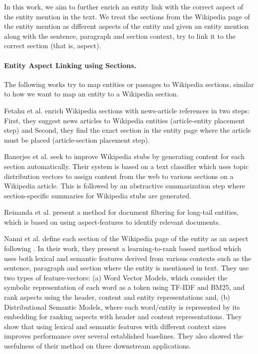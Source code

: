 \documentclass[sigconf,authordraft]{acmart}
\begin{document}
In this work, we aim to further enrich an entity link with the correct aspect of the entity mention in the text. We treat the sections from the Wikipedia page of the entity mention as different aspects of the entity and given an entity mention along with the sentence, paragraph and section context, try to link it to the correct section (that is, aspect).

\paragraph{\textbf{Entity Aspect Linking using Sections.}} 
The following works try to map entities or passages to Wikipedia sections, similar to how we want to map an entity to a Wikipedia section.

Fetahu et al. \cite{fetahu2015automated} enrich Wikipedia sections with news-article references in two steps: First, they suggest news articles to Wikipedia entities (article-entity placement step) and Second, they find the exact section in the entity page where the article must be placed (article-section placement step).

Banerjee et al. \cite{banerjee2015wikikreator} seek to improve Wikipedia stubs by generating content for each section automatically. Their system is based on a text classifier which uses topic distribution vectors to assign content from the web to various sections on a Wikipedia article. This is followed by an abstractive summarization step where section-specific summaries for Wikipedia stubs are generated.

Reinanda et al. \cite{reinanda2016document} present a method for document filtering for long-tail entities, which is based on using aspect-features to identify relevant documents. 

Nanni et al. \cite{nanni2018entity} define each section of the Wikipedia page of the entity as an aspect following \cite{fetahu2015automated,banerjee2015wikikreator,reinanda2016document}.
In their work, they present a learning-to-rank based method which uses both lexical and semantic features derived from various contexts such as the sentence, paragraph and section where the entity is mentioned in text. They use two types of feature-vectors: (a) Word Vector Models, which consider the symbolic representation of each word as a token using TF-IDF and BM25, and rank aspects using the header, content and entity representations and, (b) Distributional Semantic Models, where each word/entity is represented by its embedding for ranking aspects with header and content representations. They show that using lexical and semantic features with different context sizes improves performance over several established baselines. They also showed the usefulness of their method on three downstream applications.  
\end{document}
